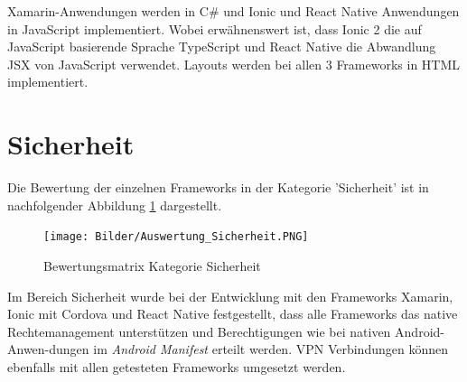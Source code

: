 Xamarin-Anwendungen werden in C\# und Ionic und React Native Anwendungen in JavaScript implementiert. Wobei erwähnenswert ist, dass Ionic 2 die auf JavaScript basierende Sprache TypeScript und React Native die Abwandlung JSX von JavaScript verwendet. Layouts werden bei allen 3 Frameworks in HTML implementiert.  

\section{Sicherheit}

Die Bewertung der einzelnen Frameworks in der Kategorie 'Sicherheit' ist in nachfolgender Abbildung \ref{fig:AuswSicherheit} dargestellt.

\begin{figure}[h]
	\centering
	\texttt{[image: Bilder/Auswertung\_Sicherheit.PNG]}
	\caption{Bewertungsmatrix Kategorie Sicherheit}
	\label{fig:AuswSicherheit}
\end{figure}

Im Bereich Sicherheit wurde bei der Entwicklung mit den Frameworks Xamarin, Ionic mit Cordova und React Native festgestellt, dass alle Frameworks das native Rechtemanagement unterstützen und Berechtigungen wie bei nativen Android-Anwen-dungen im \textit{Android Manifest} erteilt werden. VPN Verbindungen können ebenfalls mit allen getesteten Frameworks umgesetzt werden. 